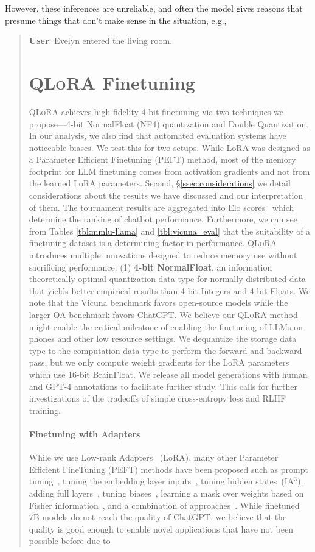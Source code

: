 However, these inferences are unreliable, and often the model gives reasons that presume things that don't make sense in the situation, e.g.,

\begin{quote}
    \textbf{User}: Evelyn entered the living room. \section{\textsc{QLoRA} Finetuning}

\textsc{QLoRA} achieves high-fidelity 4-bit finetuning via two techniques we propose—4-bit NormalFloat (NF4) quantization and Double Quantization. In our analysis, we also find that automated evaluation systems have noticeable biases. We test this for two setups. While LoRA was designed as a Parameter Efficient Finetuning (PEFT) method, most of the memory footprint for LLM finetuning comes from activation gradients and not from the learned LoRA parameters. Second, \S\ref{ssec:considerations} we detail considerations about the results we have discussed and our interpretation of them. The tournament results are aggregated into Elo scores~\citep{elo1967proposed, elo1978rating} which determine the ranking of chatbot performance. Furthermore, we can see from Tables \ref{tbl:mmlu-llama} and \ref{tbl:vicuna_eval} that the suitability of a finetuning dataset is a determining factor in performance. \textsc{QLoRA} introduces multiple innovations designed to reduce memory use without sacrificing performance: (1) \textbf{4-bit NormalFloat}, an information theoretically optimal quantization data type for normally distributed data that yields better empirical results than 4-bit Integers and 4-bit Floats. We note that the Vicuna benchmark favors open-source models while the larger OA benchmark favors ChatGPT. We believe our \textsc{QLoRA} method might enable the critical milestone of enabling the finetuning of LLMs on phones and other low resource settings. We dequantize the storage data type to the computation data type to perform the forward and backward pass, but we only compute weight gradients for the LoRA parameters which use 16-bit BrainFloat. We release all model generations with human and GPT-4 annotations to facilitate further study. This calls for further investigations of the tradeoffs of simple cross-entropy loss and RLHF training. \paragraph{Finetuning with Adapters} While we use Low-rank Adapters~\citep{hu2021lora} (LoRA), many other Parameter Efficient FineTuning (PEFT) methods have been proposed such as prompt tuning~\citep{qin2021learning,lester2021power,li2021prefix}, tuning the embedding layer inputs~\citep{an2022input}, tuning hidden states~(IA$^3$) \citep{liu2022few}, adding full layers~\citep{houlsby2019parameter}, tuning biases~\citep{zaken2021bitfit}, learning a mask over weights based on Fisher information~\citep{sung2021training}, and a combination of approaches~\citep{henderson2021compacter}. While finetuned 7B models do not reach the quality of ChatGPT, we believe that the quality is good enough to enable novel applications that have not been possible before due to 
\end{quote}

